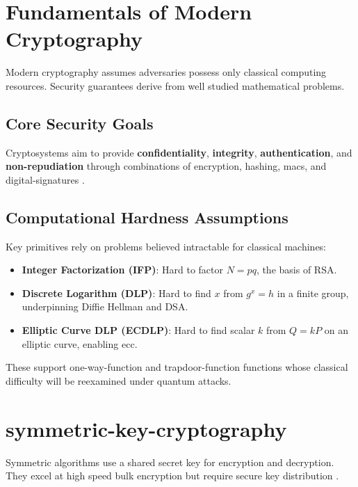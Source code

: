 \section{Fundamentals of Modern Cryptography}\label{sec:crypto_fundamentals_ch3_rev}\label{sec:security_foundations_ch3}
Modern cryptography assumes adversaries possess only classical computing resources. Security guarantees derive from well studied mathematical problems.

\subsection{Core Security Goals}
Cryptosystems aim to provide \textbf{\gls{confidentiality}}, \textbf{\gls{integrity}}, \textbf{\gls{authentication}}, and \textbf{\gls{non-repudiation}} through combinations of encryption, hashing, \glspl{mac}, and \glspl{digital-signature} \parencite{katz2014introduction, stallings2017cryptography}.

\subsection{Computational Hardness Assumptions}\label{subsec:hardness_assumptions_ch3_rev}
Key primitives rely on problems believed intractable for classical machines:
\begin{itemize}
  \item \textbf{Integer Factorization (IFP)}: Hard to factor \(N = p q\), the basis of RSA.
  \item \textbf{Discrete Logarithm (DLP)}: Hard to find \(x\) from \(g^x = h\) in a finite group, underpinning Diffie Hellman and DSA.
  \item \textbf{Elliptic Curve DLP (ECDLP)}: Hard to find scalar \(k\) from \(Q = kP\) on an elliptic curve, enabling \gls{ecc}.
\end{itemize}
These support \gls{one-way-function} and \gls{trapdoor-function} functions whose classical difficulty will be reexamined under quantum attacks.

\section{\gls{symmetric-key-cryptography}}\label{sec:symmetric_key_ch3_rev}\label{sec:symmetric_key_ch3}
Symmetric algorithms use a shared secret key for encryption and decryption. They excel at high speed bulk encryption but require secure key distribution \parencite{katz2014introduction}.

